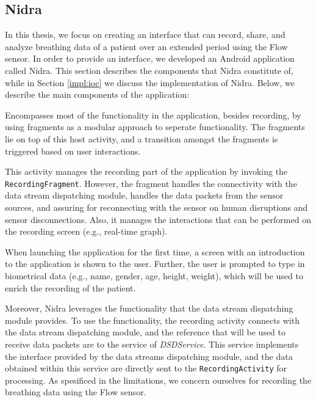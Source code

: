 \subsection{Nidra}
In this thesis, we focus on creating an interface that can record, share, and analyze breathing data of a patient over an extended period using the Flow sensor. In order to provide an interface, we developed an Android application called Nidra. This section describes the components that Nidra constitute of, while in Section \ref{impl:ioc} we discuss the implementation of Nidra. Below, we describe the main components of the application:
 
\begin{description}[font=\normalfont\itshape]
    \item[MainActivity:] Encompasses most of the functionality in the application, besides recording, by using fragments as a modular approach to seperate functionality. The fragments lie on top of this host activity, and a transition amongst the fragments is triggered based on user interactions. 
    \item[RecordingActivity:] This activity manages the recording part of the application by invoking the \verb|RecordingFragment|. However, the fragment handles the connectivity with the data stream dispatching module, handles the data packets from the sensor sources, and assuring for reconnecting with the sensor on human disruptions and sensor disconnections. Also, it manages the interactions that can be performed on the recording screen (e.g., real-time graph).
    \item[LandingActivity:] When launching the application for the first time, a screen with an introduction to the application is shown to the user. Further, the user is prompted to type in biometrical data (e.g., name, gender, age, height, weight), which will be used to enrich the recording of the patient. 
\end{description}

Moreover, Nidra leverages the functionality that the data stream dispatching module provides. To use the functionality, the recording activity connects with the data stream dispatching module, and the reference that will be used to receive data packets are to the service of \textit{DSDService}. This service implements the interface provided by the data streams dispatching module, and the data obtained within this service are directly sent to the \verb|RecordingActivity| for processing. As spesificed in the limitations, we concern ourselves for recording the breathing data using the Flow sensor. 

